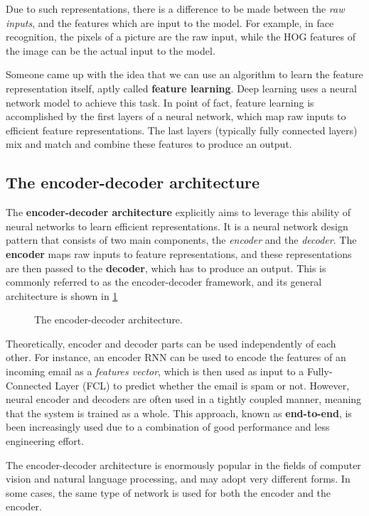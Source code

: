 Due to such representations, there is a difference to be made between the \textit{raw inputs}, and the features which are input to the model. For example, in face recognition, the pixels of a picture are the raw input, while the HOG features of the image can be the actual input to the model.

Someone came up with the idea that we can use an algorithm to learn the feature representation itself, aptly called \textbf{feature learning}. Deep learning uses a neural network model to achieve this task. In point of fact, feature learning is accomplished by the first layers of a neural network, which map raw inputs to efficient feature representations. The last layers (typically fully connected layers) mix and match and combine these features to produce an output.

\subsection{The encoder-decoder architecture}

The \textbf{encoder-decoder architecture} explicitly aims to leverage this ability of neural networks to learn efficient representations. It is a neural network design pattern that consists of two main components, the \textit{encoder} and the \textit{decoder}.  The \textbf{encoder} maps raw inputs to feature representations, and these representations are then passed to the \textbf{decoder}, which has to produce an output. This is commonly referred to as the encoder-decoder framework, and its general architecture is shown in \cref{fig:encoder-decoder}

\begin{figure}[hpt]
	\centering
	
	\caption{The encoder-decoder architecture.}
	\label{fig:encoder-decoder}
\end{figure}

Theoretically, encoder and decoder parts can be used independently of each other. For instance, an encoder RNN can be used to encode the features of an incoming email as a \textit{features vector}, which is then used as input to a Fully-Connected Layer (FCL) to predict whether the email is spam or not. However, neural encoder and decoders are often used in a tightly coupled manner, meaning that the system is trained as a whole. This approach, known as \textbf{end-to-end}, is been increasingly used due to a combination of good performance and less engineering effort.

The encoder-decoder architecture is enormously popular in the fields of computer vision and natural language processing, and may adopt very different forms. In some cases, the same type of network is used for both the encoder and the encoder.

